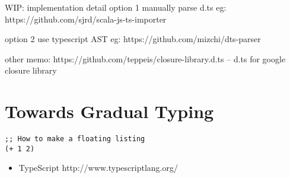 \documentclass[preprint]{sigplanconf}
\begin{document}
WIP:
 implementation detail
 option 1 manually parse d.ts
 eg: https://github.com/sjrd/scala-js-ts-importer

 option 2 use typescript AST
 eg: https://github.com/mizchi/dts-parser

 other
 memo: https://github.com/teppeis/closure-library.d.ts -- d.ts for google closure library
\label{js-ann}

\section{Towards Gradual Typing}
\label{towards-gradual}

\begin{lstlisting}[float]
;; How to make a floating listing
(+ 1 2)
\end{lstlisting}

\printbibliography[title=References]
\begin{itemize}
  \item TypeScript http://www.typescriptlang.org/
\end{itemize}
\end{document}
